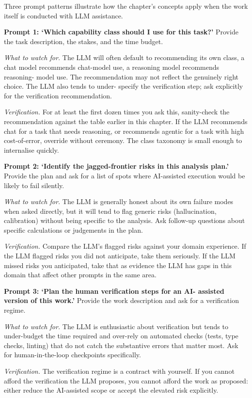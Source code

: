 \documentclass[
  letterpaper,
  11pt]{scrbook}
\begin{document}
Three prompt patterns illustrate how the chapter's concepts apply when
the work itself is conducted with LLM assistance.

\textbf{Prompt 1: `Which capability class should I use for this task?'}
Provide the task description, the stakes, and the time budget.

\emph{What to watch for.} The LLM will often default to recommending its
own class, a chat model recommends chat-model use, a reasoning model
recommends reasoning- model use. The recommendation may not reflect the
genuinely right choice. The LLM also tends to under- specify the
verification step; ask explicitly for the verification recommendation.

\emph{Verification.} For at least the first dozen times you ask this,
sanity-check the recommendation against the table earlier in this
chapter. If the LLM recommends chat for a task that needs reasoning, or
recommends agentic for a task with high cost-of-error, override without
ceremony. The class taxonomy is small enough to internalise quickly.

\textbf{Prompt 2: `Identify the jagged-frontier risks in this analysis
plan.'} Provide the plan and ask for a list of spots where AI-assisted
execution would be likely to fail silently.

\emph{What to watch for.} The LLM is generally honest about its own
failure modes when asked directly, but it will tend to flag generic
risks (hallucination, calibration) without being specific to the
analysis. Ask follow-up questions about specific calculations or
judgements in the plan.

\emph{Verification.} Compare the LLM's flagged risks against your domain
experience. If the LLM flagged risks you did not anticipate, take them
seriously. If the LLM missed risks you anticipated, take that as
evidence the LLM has gaps in this domain that affect other prompts in
the same area.

\textbf{Prompt 3: `Plan the human verification steps for an AI- assisted
version of this work.'} Provide the work description and ask for a
verification regime.

\emph{What to watch for.} The LLM is enthusiastic about verification but
tends to under-budget the time required and over-rely on automated
checks (tests, type checks, linting) that do not catch the substantive
errors that matter most. Ask for human-in-the-loop checkpoints
specifically.

\emph{Verification.} The verification regime is a contract with
yourself. If you cannot afford the verification the LLM proposes, you
cannot afford the work as proposed: either reduce the AI-assisted scope
or accept the elevated risk explicitly.
\end{document}
